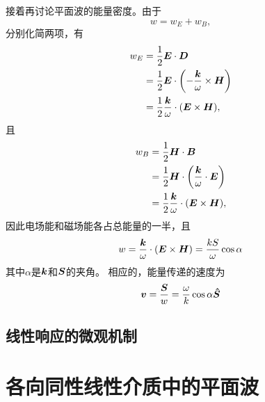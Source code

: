 \documentclass[UTF8, a4paper]{ctexart}
\begin{document}
接着再讨论平面波的能量密度。由于
\[
    w = w_E + w_B,
\]
分别化简两项，有
\[
    \begin{aligned}
        w_E &= \frac{1}{2} \vb*{E} \cdot \vb*{D} \\
        &= \frac{1}{2} \vb*{E} \cdot \left( - \frac{\vb*{k}}{\omega} \times \vb*{H} \right) \\
        &= \frac{1}{2} \frac{\vb*{k}}{\omega} \cdot (\vb*{E} \times \vb*{H}),
    \end{aligned}
\]
且
\[
    \begin{aligned}
        w_B &= \frac{1}{2} \vb*{H} \cdot \vb*{B} \\
        &= \frac{1}{2} \vb*{H} \cdot \left( \frac{\vb*{k}}{\omega} \cdot \vb*{E} \right) \\
        &= \frac{1}{2} \frac{\vb*{k}}{\omega} \cdot (\vb*{E} \times \vb*{H}),
    \end{aligned}
\]
因此电场能和磁场能各占总能量的一半，且
\begin{equation}
    w = \frac{\vb*{k}}{\omega} \cdot (\vb*{E} \times \vb*{H}) = \frac{k S}{\omega} \cos \alpha
    \label{eq:energy-density-and-s}
\end{equation}
其中$\alpha$是$\vb*{k}$和$\vb*{S}$的夹角。
相应的，能量传递的速度为
\begin{equation}
    \vb*{v} = \frac{\vb*{S}}{w} = \frac{\omega}{k}  \cos \alpha \vu*{S}
\end{equation}

\subsection{线性响应的微观机制}


\section{各向同性线性介质中的平面波}\label{sec:light-propagate}
\end{document}
